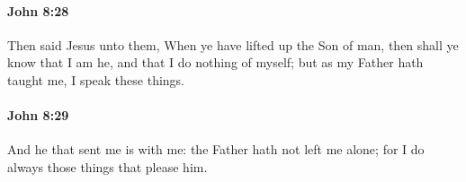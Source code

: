 		\paragraph{John 8:28} %
			\label{JOHN-8-28}

			Then said Jesus unto them, When ye have lifted up the Son of man, then shall ye know that I am he, and that I do nothing of myself; but as my Father hath taught me, I speak these things.

			\begin{framed}
				\scriptsize
				\begin{compactdesc}
					\item[SBLG] 
				\end{compactdesc}
			\end{framed}

		\paragraph{John 8:29} %
			\label{JOHN-8-29}

			And he that sent me is with me: the Father hath not left me alone; for I do always those things that please him.

